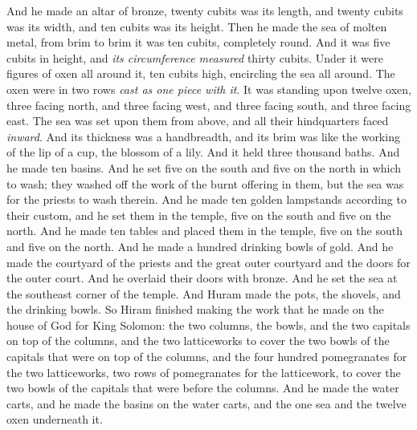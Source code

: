 \begin{biblechapter} %
 And he made an altar of bronze, twenty cubits was its length, and twenty cubits was its width, and ten cubits was its height.
\verse Then he made the sea of molten metal, from brim to brim it was ten cubits, completely round. And it was five cubits in height, and \textit{its circumference measured} thirty cubits.
\verse Under it were figures of oxen all around it, ten cubits high, encircling the sea all around. The oxen were in two rows \textit{cast as one piece with it}.
\verse It was standing upon twelve oxen, three facing north, and three facing west, and three facing south, and three facing east. The sea was set upon them from above, and all their hindquarters faced \textit{inward}.
\verse And its thickness was a handbreadth, and its brim was like the working of the lip of a cup, the blossom of a lily. And it held three thousand baths.
\verse And he made ten basins. And he set five on the south and five on the north in which to wash; they washed off the work of the burnt offering in them, but the sea was for the priests to wash therein.
\verse And he made ten golden lampstands according to their custom, and he set them in the temple, five on the south and five on the north.
\verse And he made ten tables and placed them in the temple, five on the south and five on the north. And he made a hundred drinking bowls of gold.
\verse And he made the courtyard of the priests and the great outer courtyard and the doors for the outer court. And he overlaid their doors with bronze.
\verse And he set the sea at the southeast corner of the temple.
\verse And Huram made the pots, the shovels, and the drinking bowls. So Hiram finished making the work that he made on the house of God for King Solomon:
\verse the two columns, the bowls, and the two capitals on top of the columns, and the two latticeworks to cover the two bowls of the capitals that were on top of the columns,
\verse and the four hundred pomegranates for the two latticeworks, two rows of pomegranates for the latticework, to cover the two bowls of the capitals that were before the columns.
\verse And he made the water carts, and he made the basins on the water carts,
\verse and the one sea and the twelve oxen underneath it.

\end{biblechapter}
